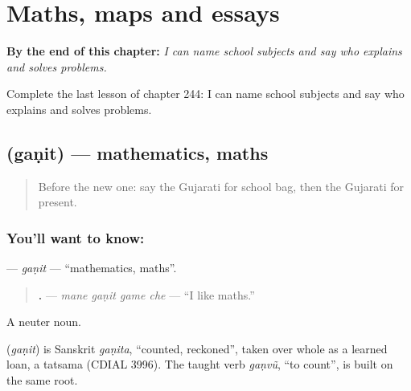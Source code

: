 
\chapter{Maths, maps and essays}
\label{ch:gu-maths-maps-and-essays}

\begin{chapteropening}
\textbf{By the end of this chapter:} \emph{I can name school subjects and say who explains and solves problems.}

Complete the last lesson of chapter 244: I can name school subjects and say who explains and solves problems.
\end{chapteropening}

\section[\texorpdfstring{\gu{ગણિત} (gaṇit)}{ગણિત (gaṇit)}]{ (gaṇit) — mathematics, maths}

\label{lesson:GU-C244-ganit}



\begin{quote}
Before the new one: say the Gujarati for school bag, then the Gujarati for present.
\end{quote}

\subsection*{You'll want to know: }
\textbf{} — \emph{gaṇit} — \textquotedblleft{}mathematics, maths\textquotedblright{}.

\begin{quote}
\textbf{   .} — \emph{mane gaṇit game che} — \textquotedblleft{}I like maths.\textquotedblright{}
\end{quote}

A neuter noun.

\begin{cousinweb}
\textbf{} (\emph{gaṇit}) is Sanskrit \emph{gaṇita}, \textquotedblleft{}counted, reckoned\textquotedblright{}, taken over whole as a learned loan, a tatsama (CDIAL 3996). The taught verb \emph{gaṇvũ}, \textquotedblleft{}to count\textquotedblright{}, is built on the same root.
\end{cousinweb}

